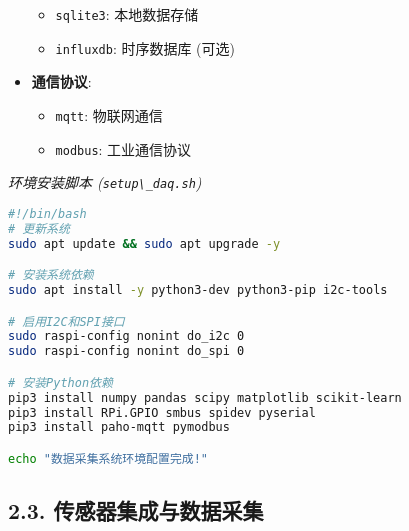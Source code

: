 \begin{itemize}
  \begin{itemize}
  \tightlist
  \item
    \passthrough{\lstinline!sqlite3!}: 本地数据存储
  \item
    \passthrough{\lstinline!influxdb!}: 时序数据库 (可选)
  \end{itemize}
\item
  \textbf{通信协议}:

  \begin{itemize}
  \tightlist
  \item
    \passthrough{\lstinline!mqtt!}: 物联网通信
  \item
    \passthrough{\lstinline!modbus!}: 工业通信协议
  \end{itemize}
\end{itemize}

\emph{环境安装脚本 (\passthrough{\lstinline!setup\_daq.sh!})}

\begin{lstlisting}[language=bash]
#!/bin/bash
# 更新系统
sudo apt update && sudo apt upgrade -y

# 安装系统依赖
sudo apt install -y python3-dev python3-pip i2c-tools

# 启用I2C和SPI接口
sudo raspi-config nonint do_i2c 0
sudo raspi-config nonint do_spi 0

# 安装Python依赖
pip3 install numpy pandas scipy matplotlib scikit-learn
pip3 install RPi.GPIO smbus spidev pyserial
pip3 install paho-mqtt pymodbus

echo "数据采集系统环境配置完成!"
\end{lstlisting}

\subsection{2.3.
传感器集成与数据采集}\label{ux4f20ux611fux5668ux96c6ux6210ux4e0eux6570ux636eux91c7ux96c6}

